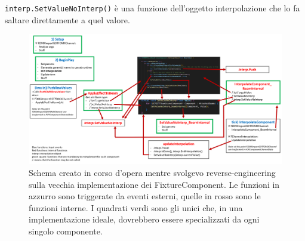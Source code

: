 \documentclass[main.tex]{subfiles}
\begin{document}
\lstinline{interp.SetValueNoInterp()} è una funzione dell'oggetto interpolazione che lo fa saltare direttamente a quel valore.

\begin{figure}[H]
    \centering
    \includegraphics[width=1\linewidth]{img/fixtureComponent/CallOrderScheme.png}
    \caption{Schema creato in corso d'opera mentre svolgevo reverse-engineering sulla vecchia implementazione dei FixtureComponent. Le funzioni in azzurro sono triggerate da eventi esterni, quelle in rosso sono le funzioni interne. I quadrati verdi sono gli unici che, in una implementazione ideale, dovrebbero essere specializzati da ogni singolo componente.}
    \label{fig:3_CallOrderOld}
\end{figure}
\end{document}
